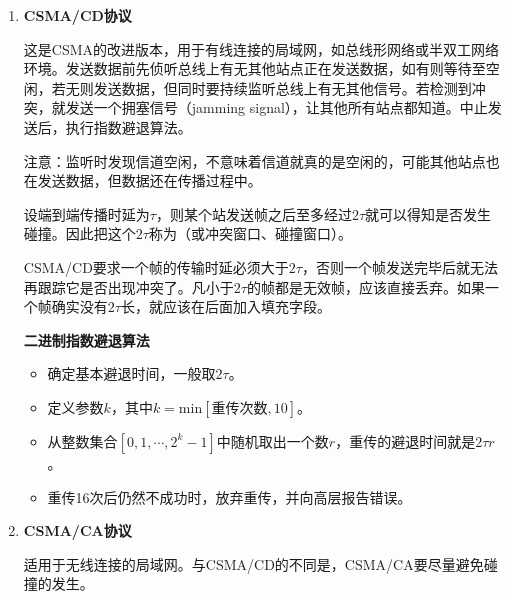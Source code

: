 \documentclass[12pt, a4paper, oneside]{ctexart}
\begin{document}
\begin{enumerate}
\begin{enumerate}
        \begin{table}[h]
            \centering
            \caption{三种不同类型的CSMA协议的比较}
        \end{table}
    \end{enumerate}

    \item {\bf CSMA/CD协议}
    
    这是CSMA的改进版本，用于有线连接的局域网，如总线形网络或半双工网络环境。发送数据前先侦听总线上有无其他站点正在发送数据，如有则等待至空闲，若无则发送数据，但同时要持续监听总线上有无其他信号。若检测到冲突，就发送一个拥塞信号（jamming signal），让其他所有站点都知道。中止发送后，执行指数避退算法。

    注意：监听时发现信道空闲，不意味着信道就真的是空闲的，可能其他站点也在发送数据，但数据还在传播过程中。

    设端到端传播时延为$\tau$，则某个站发送帧之后至多经过$2\tau$就可以得知是否发生碰撞。因此把这个$2\tau$称为（或冲突窗口、碰撞窗口）。

    CSMA/CD要求一个帧的传输时延必须大于$2\tau$，否则一个帧发送完毕后就无法再跟踪它是否出现冲突了。凡小于$2\tau$的帧都是无效帧，应该直接丢弃。如果一个帧确实没有$2\tau$长，就应该在后面加入填充字段。

    \textbf{二进制指数避退算法}
    \begin{itemize}
        \item 确定基本避退时间，一般取$2\tau$。
        \item 定义参数$k$，其中$k=\text{min}[\text{重传次数}, 10]$。
        \item 从整数集合$[0,1,\cdots,2^k-1]$中随机取出一个数$r$，重传的避退时间就是$2\tau r$。
        \item 重传16次后仍然不成功时，放弃重传，并向高层报告错误。
    \end{itemize}
    \item {\bf CSMA/CA协议}
    
    适用于无线连接的局域网。与CSMA/CD的不同是，CSMA/CA要尽量避免碰撞的发生。
\end{enumerate}
\end{document}
